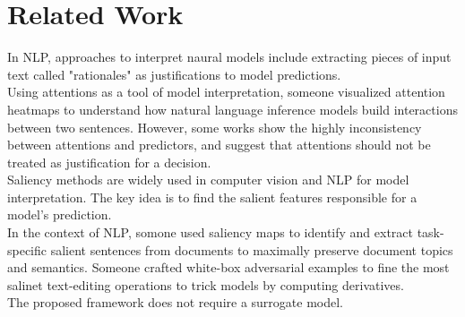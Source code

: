 \section{Related Work}

In NLP, approaches to interpret naural models include extracting pieces of input
text called "rationales" as justifications to model predictions.\\
Using attentions as a tool of model interpretation, someone visualized attention
heatmaps to understand how natural language inference models build interactions
between two sentences. However, some works show the highly
inconsistency between attentions and predictors, and suggest that attentions
should not be treated as justification for a decision.\\
Saliency methods are widely used in computer vision and NLP for model
interpretation. The key idea is to find the salient features responsible for a
model's prediction.\\
In the context of NLP, somone used saliency maps to identify and extract
task-specific salient sentences from documents to maximally preserve document
topics and semantics. Someone crafted white-box adversarial examples to fine the
most salinet text-editing operations to trick models by computing derivatives.\\
The proposed framework does not require a surrogate model.
